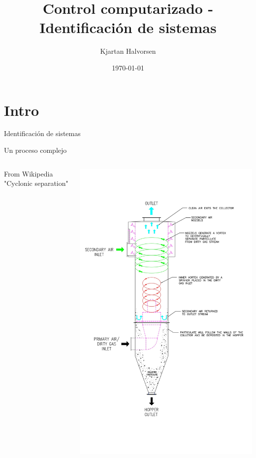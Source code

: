 \documentclass[presentation,aspectratio=169]{beamer}
\author{Kjartan Halvorsen}
\date{\today}
\title{Control computarizado - Identificación de sistemas}
\begin{document}
\maketitle

\section{Intro}
\label{sec:org4df3f35}
\begin{frame}[label={sec:orga72d84e}]{Identificación de sistemas}
\end{frame}

\begin{frame}[label={sec:orgf47233b}]{Un proceso complejo}
\begin{columns}
\begin{column}{0.6\columnwidth}
From Wikipedia "Cyclonic separation"
\end{column}
\begin{column}{0.4\columnwidth}
\begin{center}
\includegraphics[height=1.0\textheight]{../../figures/Vertical-cyclone.jpg}
\end{center}
\end{column}
\end{columns}
\end{frame}
\end{document}
